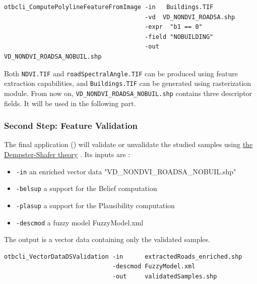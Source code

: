 \begin{verbatim}
otbcli_ComputePolylineFeatureFromImage -in   Buildings.TIF
                                       -vd  VD_NONDVI_ROADSA.shp
                                       -expr  "b1 == 0"
                                       -field "NOBUILDING"
                                       -out   VD_NONDVI_ROADSA_NOBUIL.shp
\end{verbatim}

Both \verb?NDVI.TIF? and \verb?roadSpectralAngle.TIF? can be produced
using \mont feature extraction capabilities, and \verb?Buildings.TIF?
can be generated using \mont rasterization module. From now on,
\verb?VD_NONDVI_ROADSA_NOBUIL.shp? contains three descriptor fields.
It will be used in the following part.

\subsubsection{Second Step: Feature Validation}

The final application () will
validate or unvalidate the studied samples using
\href{http://en.wikipedia.org/wiki/Dempster\%E2\%80\%93Shafer_theory}{the Dempster-Shafer theory}
. Its inputs are :
\begin{itemize}
\item \verb?-in? an enriched vector data "VD\_NONDVI\_ROADSA\_NOBUIL.shp"
\item \verb?-belsup? a support for the Belief computation
\item \verb?-plasup? a support for the Plausibility computation
\item \verb?-descmod? a fuzzy model FuzzyModel.xml
\end{itemize}
The output is a vector data containing only the validated samples.

\begin{verbatim}
otbcli_VectorDataDSValidation -in      extractedRoads_enriched.shp
                              -descmod FuzzyModel.xml
                              -out     validatedSamples.shp
\end{verbatim}



